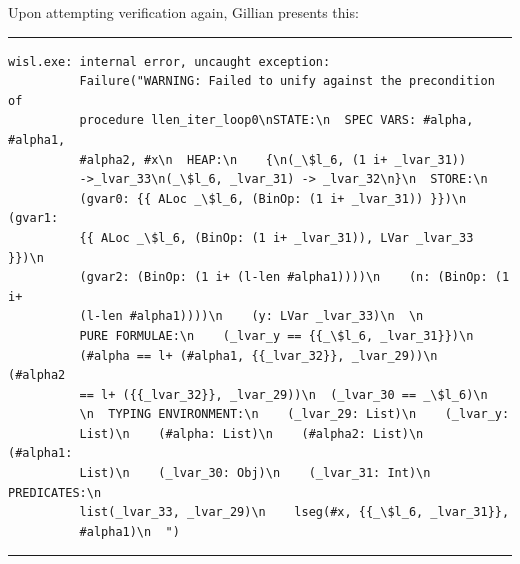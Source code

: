 Upon attempting verification again, Gillian presents this:
\noindent\rule{\textwidth}{0.5pt}
\vspace{-0.6cm}
\begin{verbatim}
wisl.exe: internal error, uncaught exception:
          Failure("WARNING: Failed to unify against the precondition of
          procedure llen_iter_loop0\nSTATE:\n  SPEC VARS: #alpha, #alpha1,
          #alpha2, #x\n  HEAP:\n    {\n(_\$l_6, (1 i+ _lvar_31))
          ->_lvar_33\n(_\$l_6, _lvar_31) -> _lvar_32\n}\n  STORE:\n    
          (gvar0: {{ ALoc _\$l_6, (BinOp: (1 i+ _lvar_31)) }})\n    (gvar1:
          {{ ALoc _\$l_6, (BinOp: (1 i+ _lvar_31)), LVar _lvar_33 }})\n    
          (gvar2: (BinOp: (1 i+ (l-len #alpha1))))\n    (n: (BinOp: (1 i+
          (l-len #alpha1))))\n    (y: LVar _lvar_33)\n  \n  
          PURE FORMULAE:\n    (_lvar_y == {{_\$l_6, _lvar_31}})\n    
          (#alpha == l+ (#alpha1, {{_lvar_32}}, _lvar_29))\n    (#alpha2 
          == l+ ({{_lvar_32}}, _lvar_29))\n  (_lvar_30 == _\$l_6)\n  
          \n  TYPING ENVIRONMENT:\n    (_lvar_29: List)\n    (_lvar_y:
          List)\n    (#alpha: List)\n    (#alpha2: List)\n    (#alpha1:
          List)\n    (_lvar_30: Obj)\n    (_lvar_31: Int)\n  PREDICATES:\n    
          list(_lvar_33, _lvar_29)\n    lseg(#x, {{_\$l_6, _lvar_31}}, 
          #alpha1)\n  ")
\end{verbatim}
\vspace{-0.4cm}
\noindent\rule{\textwidth}{0.5pt}
\vspace{-0.6cm}
\vspace{0.5cm}

